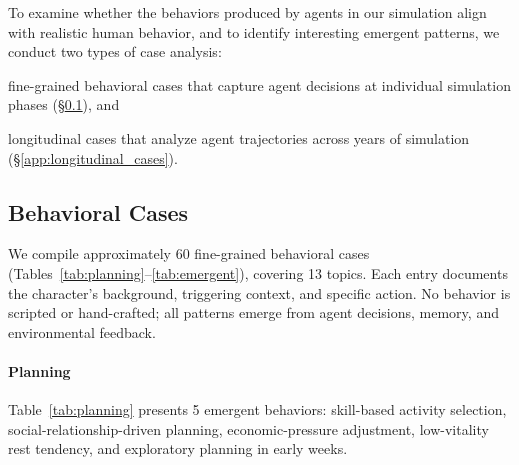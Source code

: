 To examine whether the behaviors produced by agents in our simulation align with realistic human behavior,
and to identify interesting emergent patterns,
we conduct two types of case analysis:
\begin{inparaenum}[\it (1)]
\item fine-grained behavioral cases that capture agent decisions at individual simulation phases
(\S\ref{app:behavioral_cases}), and
\item longitudinal cases that analyze agent trajectories across years of simulation
(\S\ref{app:longitudinal_cases}).
\end{inparaenum}


\subsection{Behavioral Cases}
\label{app:behavioral_cases}

We compile approximately 60 fine-grained behavioral cases
(Tables~\ref{tab:planning}--\ref{tab:emergent}),
covering 13 topics.
Each entry documents the character's background, triggering context, and specific action.
No behavior is scripted or hand-crafted;
all patterns emerge from agent decisions, memory, and environmental feedback.

\paragraph{Planning}
Table~\ref{tab:planning} presents 5 emergent behaviors:
skill-based activity selection, social-relationship-driven planning, economic-pressure adjustment, low-vitality rest tendency, and exploratory planning in early weeks.

